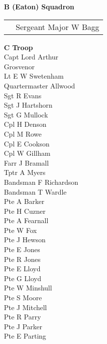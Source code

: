 \begin{center}
  \Large
  \textbf{B (Eaton) Squadron}
\end{center}

\vspace*{3mm}

\begin{center}
  \begin{tabular}{rl}
    & Sergeant Major W Bagg \\
  \end{tabular}
\end{center}

\vspace*{3mm}

\begin{multicols}{3}
  \small
  \noindent
  \textbf{C Troop} \\
  Capt Lord Arthur \\ \indent Grosvenor \\
  Lt E W Swetenham \\
  Quartermaster Allwood \\
  Sgt R Evans \\
  Sgt J Hartshorn \\
  Sgt G Mullock \\
  Cpl H Denson \\
  Cpl M Rowe \\
  Cpl E Cookson \\
  Cpl W Gillham \\
  Farr J Bramall \\
  Tptr A Myers \\
  Bandsman F Richardson \\
  Bandsman T Wardle \\
  Pte A Barker \\
  Pte H Cuzner \\
  Pte A Fearnall \\
  Pte W Fox \\
  Pte J Hewson \\
  Pte E Jones \\
  Pte R Jones \\
  Pte E Lloyd \\
  Pte G Lloyd \\
  Pte W Minshull \\
  Pte S Moore \\
  Pte J Mitchell \\
  Pte R Parry \\
  Pte J Parker \\
  Pte E Parting \\

\end{multicols}
